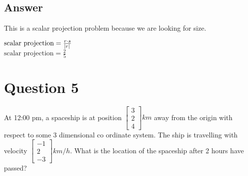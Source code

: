 \documentclass[12pt]{article}
\begin{document}
    \subsection*{Answer}
    \begin{flushleft}
        This is a scalar projection problem because we are looking for size.
    \end{flushleft}
    \begin{flushleft}
        $
            \text{scalar projection} = \frac{r \cdot s}{\abs{r}}
        $ \\
        $
            \boxed{\text{scalar projection} = \frac{2}{5}}
        $
    \end{flushleft}

    \section*{Question 5}
    \begin{flushleft}
        At 12:00 pm, a spaceship is at position
        $
            \begin{bmatrix}
                3 \\ 2 \\ 4
            \end{bmatrix}
            km
        $
        away from the origin with respect to some 3 dimensional co ordinate system. The ship is travelling with velocity
        $
            \begin{bmatrix}
                -1 \\ 2 \\ -3
            \end{bmatrix}
            km/h.
        $
        What is the location of the spaceship after 2 hours have passed?
    \end{flushleft}
\end{document}
